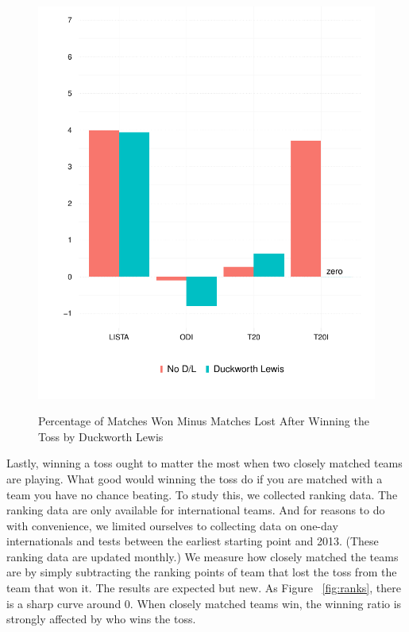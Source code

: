 \documentclass[11pt]{article}
\begin{document}
\begin{figure}[htbp]
\centering
\caption{Percentage of Matches Won Minus Matches Lost After Winning the Toss by Duckworth Lewis}
\includegraphics[scale=.85]{../figs/winbyDL.pdf}
\label{fig:dl}
\end{figure}

Lastly, winning a toss ought to matter the most when two closely matched teams are playing. What good would winning the toss do if you are matched with a team you have no chance beating. To study this, we collected ranking data. The ranking data are only available for international teams. And for reasons to do with convenience, we limited ourselves to collecting data on one-day internationals and tests between the earliest starting point and 2013. (These ranking data are updated monthly.) We measure how closely matched the teams are by simply subtracting the ranking points of team that lost the toss from the team that won it. The results are expected but new. As Figure ~\ref{fig:ranks}, there is a sharp curve around 0. When closely matched teams win, the winning ratio is strongly affected by who wins the toss.
\end{document}
